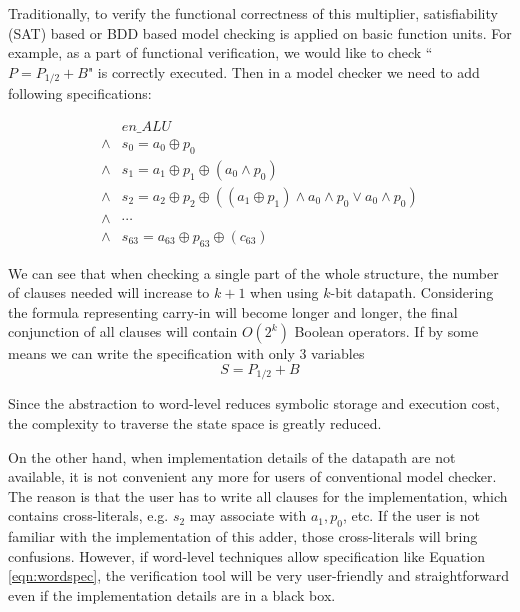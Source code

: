 \begin{Example}
\vspace{0.2in}

Traditionally, to verify the functional correctness of this multiplier, satisfiability (SAT) based or BDD based 
model checking is applied on basic function units. For example, as a part of functional verification, 
we would like to check ``$P=P_{1/2}+B$" is correctly executed. Then in a model checker we need to add following 
specifications:

\begin{align*}
& en\_ALU \\
\land & s_0 = a_0 \oplus p_0 \\
\land & s_1 = a_1 \oplus p_1 \oplus (a_0 \land p_0) \\
\land & s_2 = a_2 \oplus p_2 \oplus ((a_1 \oplus p_1) \land a_0 \land p_0 \lor a_0 \land p_0) \\
\land & \cdots \\
\land & s_{63} = a_{63} \oplus p_{63} \oplus (c_{63})
\end{align*}

We can see that when checking a single part of the whole structure, the number of clauses 
needed will increase to $k+1$ when using $k$-bit datapath. Considering the formula representing 
carry-in will become longer and longer, the final conjunction of all clauses will contain 
$O(2^k)$ Boolean operators. If by some means we can write the specification with only 3 variables
\begin{equation}
\label{eqn:wordspec}
S=P_{1/2}+B
\end{equation}

Since the abstraction to word-level reduces symbolic storage and execution cost, the complexity 
to traverse the state space is greatly reduced.
\end{Example}

On the other hand, when implementation details of the datapath are not available, it is not convenient 
any more for users of conventional model checker. The reason is that the user has to write all clauses 
for the implementation, which contains cross-literals, e.g. $s_2$ may associate with $a_1, p_0$, etc. If the user 
is not familiar with the implementation of this adder, those cross-literals will bring
confusions. However, if word-level techniques allow specification like Equation \ref{eqn:wordspec},
the verification tool will be very user-friendly and straightforward even if the implementation details
are in a black box.

